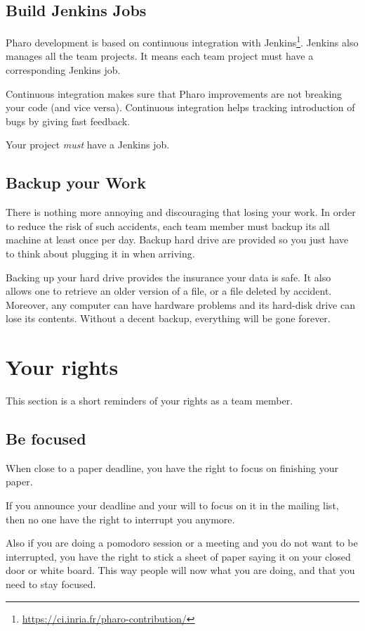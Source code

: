 \documentclass[10pt]{article}
\begin{document}
\subsection{Build Jenkins Jobs}

Pharo development is based on continuous integration with Jenkins\footnote{\url{https://ci.inria.fr/pharo-contribution/}}. Jenkins also manages all the team projects. It means each team project must have a corresponding Jenkins job.

Continuous integration makes sure that Pharo improvements are not breaking your code (and vice versa). Continuous integration helps tracking introduction of bugs by giving fast feedback.

Your project \emph{must} have a Jenkins job.

\subsection{Backup your Work}

There is nothing more annoying and discouraging that losing your work. In order to reduce the risk of such accidents, each team member must backup its all machine at least once per day. Backup hard drive are provided so you just have to think about plugging it in when arriving.

Backing up your hard drive provides the insurance your data is safe. It also allows one to retrieve an older version of a file, or a file deleted by accident.
Moreover, any computer can have hardware problems and its hard-disk drive can lose its contents. Without a decent backup, everything will be gone forever.

\section{Your rights}

This section is a short reminders of your rights as a team member.

\subsection{Be focused}

When close to a paper deadline, you have the right to focus on finishing your paper.

If you announce your deadline and your will to focus on it in the mailing list, then no one have the right to interrupt you anymore.

Also if you are doing a pomodoro session or a meeting and you do not want to be interrupted, you have the right to stick a sheet of paper saying it on your closed door or white board. This way people will now what you are doing, and that you need to stay focused.
\end{document}

